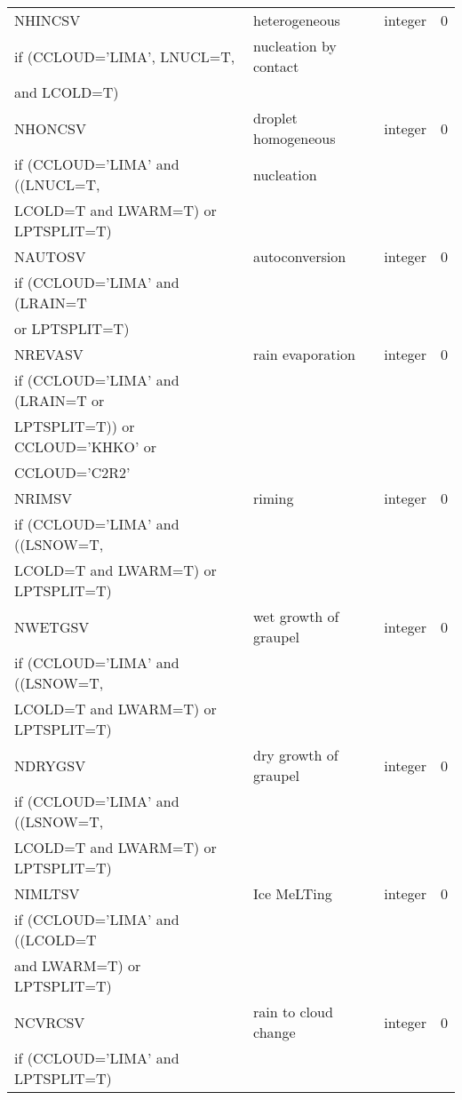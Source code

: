 \begin{longtable} {|p{}|p{}|>{\centering}p{}|p{}<{\centering}|}
NHINCSV & heterogeneous  & integer & 0 \\ \nopagebreak
if (CCLOUD='LIMA', LNUCL=T,&nucleation by contact&&\\ \nopagebreak
and LCOLD=T)&&& \\\hline

NHONCSV & droplet homogeneous  & integer & 0 \\ \nopagebreak
if (CCLOUD='LIMA' and ((LNUCL=T,& nucleation &&\\ \nopagebreak
LCOLD=T and LWARM=T) or LPTSPLIT=T)&&& \\\hline

NAUTOSV & autoconversion & integer & 0 \\ \nopagebreak
if (CCLOUD='LIMA' and (LRAIN=T&&&\\ \nopagebreak
or LPTSPLIT=T)&&& \\\hline

NREVASV & rain evaporation & integer & 0 \\ \nopagebreak
if (CCLOUD='LIMA' and (LRAIN=T or &&& \\ \nopagebreak
LPTSPLIT=T)) or CCLOUD='KHKO'  or &&& \\ \nopagebreak
CCLOUD='C2R2' &&& \\\hline

NRIMSV & riming & integer & 0 \\  \nopagebreak
if (CCLOUD='LIMA' and ((LSNOW=T,&&&\\  \nopagebreak
LCOLD=T and LWARM=T) or LPTSPLIT=T)&&& \\\hline

NWETGSV & wet growth of graupel & integer & 0 \\ \nopagebreak
if (CCLOUD='LIMA' and ((LSNOW=T,&&&\\  \nopagebreak
LCOLD=T and LWARM=T) or LPTSPLIT=T)&&& \\\hline

NDRYGSV & dry growth of graupel & integer & 0 \\  \nopagebreak
if (CCLOUD='LIMA' and ((LSNOW=T,&&&\\  \nopagebreak
LCOLD=T and LWARM=T) or LPTSPLIT=T)&&& \\\hline

NIMLTSV & Ice MeLTing & integer & 0 \\ \nopagebreak
if (CCLOUD='LIMA' and ((LCOLD=T&&&\\ \nopagebreak
and LWARM=T) or LPTSPLIT=T)&&& \\\hline

NCVRCSV & rain to cloud change & integer & 0 \\ \nopagebreak
if (CCLOUD='LIMA' and LPTSPLIT=T)&&& \\\hline


\end{longtable}
